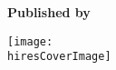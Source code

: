
\thispagestyle{empty}

\begin{center}
    \bfseries \sffamily \Huge \mytitle\par
    \bfseries \LARGE \mysubtitle\par
    ~\\
    ~\\
    \bfseries \small Published by \mypublishingcompany%
	
    \ifxetex
        \texttt{[image: \\hiresCoverImage]}
    \else
    \fi
\end{center}